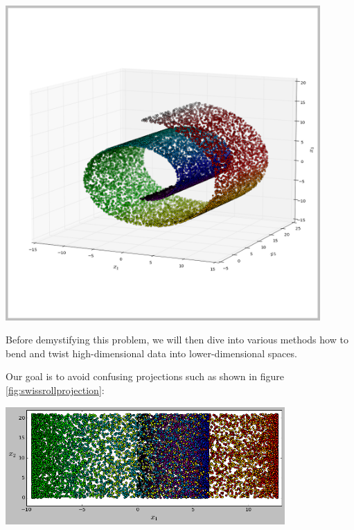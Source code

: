\noindent
\begin{minipage}[c]{0.4\linewidth}
%
\vspace*{6mm}
\begin{center}
	\includegraphics[width=0.9\textwidth]{external_content/graphs/swiss_roll.png}
	\captionsetup{justification=centering,type=htypei}
	\label{fig:swissrollfull}
\end{center}
%
\end{minipage}\hfill%
\begin{minipage}[c]{0.55\linewidth}
Before demystifying this problem, we will then dive into various methods how to bend and twist high-dimensional data into lower-dimensional spaces.

Our goal is to avoid confusing projections such as shown in figure \ref{fig:swissrollprojection}:

\begin{center}
	\includegraphics[width=0.8\textwidth]{external_content/graphs/swiss_roll-projection.png}
	\captionsetup{justification=centering,type=htypei}
	\label{fig:swissrollprojection}
\end{center}
\end{minipage}%


